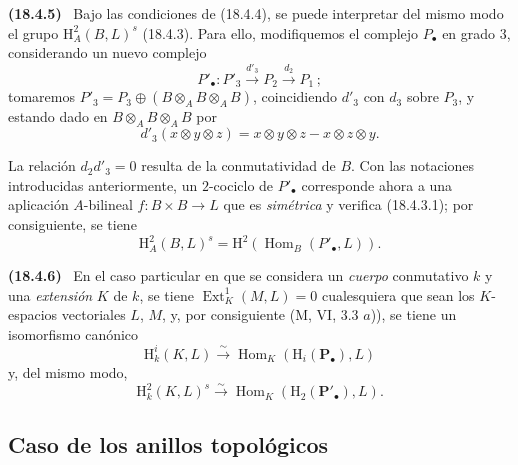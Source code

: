 \documentclass[10pt,oneside]{book}
\makeatletter
\newcommand{\setmanualcurrentlabel}[1]{\def\@currentlabel{#1}}
\newenvironment{env}[1][]{\setmanualcurrentlabel{#1}\par\medskip\noindent\textbf{(#1)}\ }{\par}
\makeatother
\begin{document}
\begin{env}[18.4.5]
\label{0.18.4.5-es}
Bajo las condiciones de (18.4.4), se puede interpretar del mismo modo el
grupo $\mathrm H_A^2(B,L)^s$ (18.4.3). Para ello, modifiquemos el complejo
$P_\bullet$ en grado $3$, considerando un nuevo complejo
\[
  P'_\bullet:P'_3\xrightarrow{d'_3}P_2
  \xrightarrow{d_2}P_1\,;
\]
tomaremos
$P'_3=P_3\oplus(B\otimes_A B\otimes_A B)$, coincidiendo
$d'_3$ con $d_3$ sobre $P_3$, y estando dado en
$B\otimes_A B\otimes_A B$ por
\[
  d'_3(x\otimes y\otimes z)=x\otimes y\otimes z-x\otimes z\otimes y.
\]

La relación $d_2d'_3=0$ resulta de la conmutatividad de $B$. Con las notaciones
introducidas anteriormente, un $2$-cociclo de $P'_\bullet$ corresponde
ahora a una aplicación $A$-bilineal $f:B\times B\to L$ que es
\emph{simétrica} y verifica (18.4.3.1); por consiguiente, se tiene
\[
  \mathrm H_A^2(B,L)^s
  =\mathrm H^2(\operatorname{Hom}_B(P'_\bullet,L)).
\]
\end{env}

\begin{env}[18.4.6]
\label{0.18.4.6-es}
En el caso particular en que se considera un \emph{cuerpo} conmutativo $k$ y
una \emph{extensión} $K$ de $k$, se tiene
$\operatorname{Ext}_K^1(M,L)=0$ cualesquiera que sean los $K$-espacios
vectoriales $L$, $M$, y, por consiguiente (M, VI, 3.3 $a$)), se tiene un
isomorfismo canónico
\begin{equation}
\label{0.18.4.6.1-es}
\tag{18.4.6.1}
  \mathrm H_k^i(K,L)\xrightarrow{\sim}
  \operatorname{Hom}_K(\mathrm H_i(\mathbf P_\bullet),L)
\end{equation}
y, del mismo modo,
\begin{equation}
\label{0.18.4.6.2-es}
\tag{18.4.6.2}
  \mathrm H_k^2(K,L)^s\xrightarrow{\sim}
  \operatorname{Hom}_K(\mathrm H_2(\mathbf P'_\bullet),L).
\end{equation}
\end{env}

\subsection{Caso de los anillos topológicos}
\label{subsection:0.18.5-es}
\end{document}
